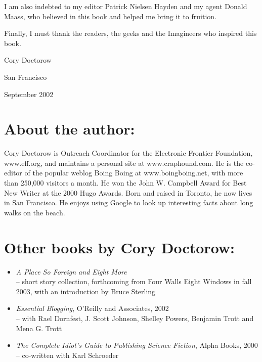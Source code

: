I am also indebted to my editor Patrick Nielsen Hayden and my agent
Donald Maass, who believed in this book and helped me bring it to
fruition.

Finally, I must thank the readers, the geeks and the Imagineers who
inspired this book.

Cory Doctorow

San Francisco

September 2002

\section{About the author:}

Cory Doctorow is Outreach Coordinator for the Electronic Frontier
Foundation, www.eff.org, and maintains a personal site at
www.craphound.com. He is the co-editor of the popular weblog Boing
Boing at www.boingboing.net, with more than 250,000 visitors a
month. He won the John W. Campbell Award for Best New Writer at the
2000 Hugo Awards. Born and raised in Toronto, he now lives in San
Francisco. He enjoys using Google to look up interesting facts
about long walks on the beach.

\section{Other books by Cory Doctorow:}
\begin{itemize}
\item
\emph{A Place So Foreign and Eight More}\\– short story collection,
forthcoming from Four Walls Eight Windows in fall 2003, with an
introduction by Bruce Sterling
\item
\emph{Essential Blogging}, O'Reilly and Associates, 2002\\– with
Rael Dornfest, J. Scott Johnson, Shelley Powers, Benjamin Trott and
Mena G. Trott
\item
\emph{The Complete Idiot's Guide to Publishing Science Fiction},
Alpha Books, 2000\\– co-written with Karl Schroeder
\end{itemize}
